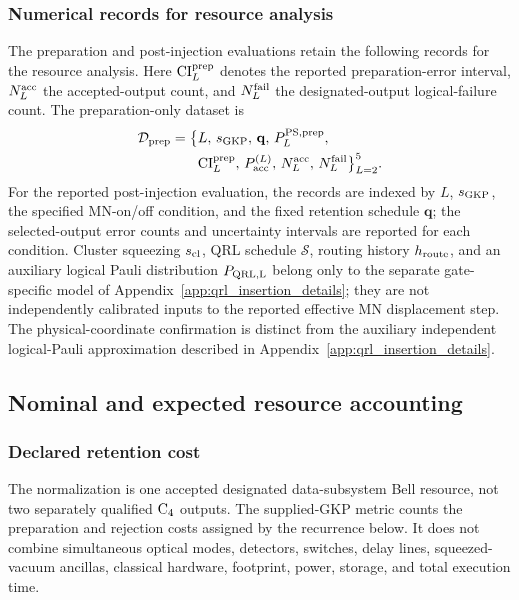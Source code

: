 \documentclass[aps,
prx,
superscriptaddress,
reprint,
longbibliography,
floatfix]{revtex4-2}
\begin{document}
\subsubsection{Numerical records for resource analysis}\label{app:numerical_output_records}
The preparation and post-injection evaluations retain the following records for the resource analysis. Here ${\rm CI}_L^{\rm prep}$ denotes the reported preparation-error interval, $N_L^{\rm acc}$ the accepted-output count, and $N_L^{\rm fail}$ the designated-output logical-failure count. The preparation-only dataset is
\begin{align}
\mathcal D_{\rm prep}
=
\bigl\{&
L,\,
s_{\rm GKP},\,
\mathbf q,\,
P_{L}^{\rm PS,prep},
\nonumber\\
&
{\rm CI}_{L}^{\rm prep},\,
P_{\rm acc}^{(L)},\,
N_L^{\rm acc},\,N_L^{\rm fail}
\bigr\}_{L=2}^{5}.
\label{eq:dataset_prep_recursive}
\end{align}
For the reported post-injection evaluation, the records are indexed by $L$, $s_{\rm GKP}$, the specified MN-on/off condition, and the fixed retention schedule $\mathbf q$; the selected-output error counts and uncertainty intervals are reported for each condition. Cluster squeezing $s_{\rm cl}$, QRL schedule $\mathcal S$, routing history $h_{\rm route}$, and an auxiliary logical Pauli distribution $P_{\rm QRL,L}$ belong only to the separate gate-specific model of Appendix~\ref{app:qrl_insertion_details}; they are not independently calibrated inputs to the reported effective MN displacement step.
The physical-coordinate confirmation is distinct from the auxiliary independent logical-Pauli approximation described in Appendix~\ref{app:qrl_insertion_details}.


\subsection{Nominal and expected resource accounting}\label{app:resource_accounting}
\subsubsection{Declared retention cost}
The normalization is one accepted designated data-subsystem Bell resource, not two separately qualified ${\rm C_4}$ outputs. The supplied-GKP metric counts the preparation and rejection costs assigned by the recurrence below. It does not combine simultaneous optical modes, detectors, switches, delay lines, squeezed-vacuum ancillas, classical hardware, footprint, power, storage, and total execution time.
\end{document}
